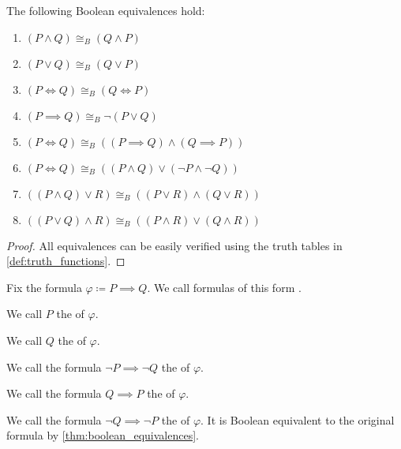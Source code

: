\begin{proposition}\label{thm:boolean_equivalences}
  The following Boolean equivalences hold:
  \begin{enumerate}
    \item \( (P \land Q) \cong_B (Q \land P) \)
    \item \( (P \lor Q) \cong_B (Q \lor P) \)
    \item \( (P \iff Q) \cong_B (Q \iff P) \)
    \item \( (P \implies Q) \cong_B \neg (P \lor Q) \)
    \item \( (P \iff Q) \cong_B ((P \implies Q) \land (Q \implies P)) \)
    \item \( (P \iff Q) \cong_B ((P \land Q) \lor (\neg P \land \neg Q)) \)
    \item \( ((P \land Q) \lor R) \cong_B ((P \lor R) \land (Q \lor R)) \)
    \item \( ((P \lor Q) \land R) \cong_B ((P \land R) \lor (Q \land R)) \)
  \end{enumerate}
\end{proposition}
\begin{proof}
  All equivalences can be easily verified using the truth tables in \cref{def:truth_functions}.
\end{proof}

\begin{definition}\label{def:material_implication}
  Fix the formula \( \varphi \coloneqq P \implies Q \). We call formulas of this form .

  \begin{defenum}
     We call \( P \) the  of \( \varphi \).

     We call \( Q \) the  of \( \varphi \).

     We call the formula \( \neg P \implies \neg Q \) the  of \( \varphi \).

     We call the formula \( Q \implies P \) the  of \( \varphi \).

     We call the formula \( \neg Q \implies \neg P \) the  of \( \varphi \). It is Boolean equivalent to the original formula by \cref{thm:boolean_equivalences}.
  \end{defenum}
\end{definition}

